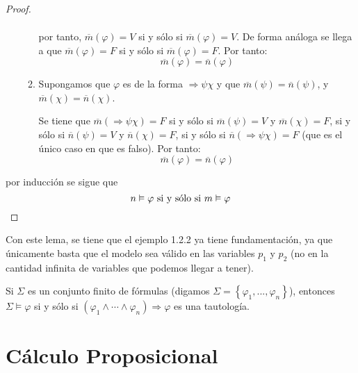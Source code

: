 \documentclass[12pt]{report}
\newcounter{it}
\theoremstyle{largebreak}
\begin{document}
\begin{proof}
\begin{itemize}
\begin{enumerate}
\begin{equation*}
\begin{split}
                    \end{split}
                \end{equation*}
                por tanto, $\overline{m}(\varphi)=V$ si y sólo si $\overline{m}(\varphi)=V$. De forma análoga se llega a que $\overline{m}(\varphi)=F$ si y sólo si $\overline{m}(\varphi)=F$. Por tanto:
                \begin{equation*}
                    \overline{m}(\varphi)=\overline{n}(\varphi)
                \end{equation*}
                \item Supongamos que $\varphi$ es de la forma $\Rightarrow\psi\chi$ y que $\overline{m}(\psi)=\overline{n}(\psi)$, y $\overline{m}(\chi)=\overline{n}(\chi)$.
                
                Se tiene que $\overline{m}(\Rightarrow\psi\chi)=F$ si y sólo si $\overline{m}(\psi)=V$ y $\overline{m}(\chi)=F$, si y sólo si $\overline{n}(\psi)=V$ y $\overline{n}(\chi)=F$, si y sólo si $\overline{n}(\Rightarrow\psi\chi)=F$ (que es el único caso en que es falso). Por tanto:
                \begin{equation*}
                    \overline{m}(\varphi)=\overline{n}(\varphi)
                \end{equation*}
            \end{enumerate}
        \end{itemize}
        por inducción se sigue que
        \begin{equation*}
            n\vDash\varphi\textup{ si y sólo si } m\vDash\varphi
        \end{equation*}
    \end{proof}

    Con este lema, se tiene que el ejemplo 1.2.2 ya tiene fundamentación, ya que únicamente basta que el modelo sea válido en las variables $p_1$ y $p_2$ (no en la cantidad infinita de variables que podemos llegar a tener).

    \begin{obs}
        Si $\Sigma$ es un conjunto finito de fórmulas (digamos $\Sigma=\left\{\varphi_1,...,\varphi_n \right\}$), entonces $\Sigma\vDash\varphi$ si y sólo si $(\varphi_1\land\cdots\land\varphi_n)\Rightarrow\varphi$ es una tautología.
    \end{obs}

    \section{Cálculo Proposicional}
\end{document}
